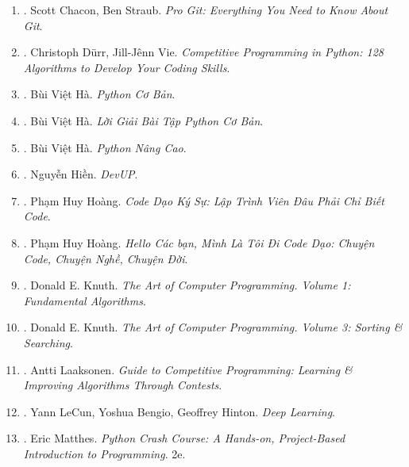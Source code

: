 \documentclass{article}
\begin{document}
\begin{enumerate}
	\item \cite{Chacon_Straub2014}. Scott Chacon, Ben Straub. {\it Pro Git: Everything You Need to Know About Git}.\hfill{\sf[reading]}
	
	\item \cite{Durr_Vie2021}. Christoph D\"urr, Jill-J\^enn Vie. {\it Competitive Programming in Python: 128 Algorithms to Develop Your Coding Skills}.
	
	\item \cite{Ha_Python_co_ban}. Bùi Việt Hà. {\it Python Cơ Bản}.\hfill{\sf[done]}
	
	\item \cite{Ha_loi_giai_BT_Python_co_ban}. Bùi Việt Hà. {\it Lời Giải Bài Tập Python Cơ Bản}.\hfill{\sf[reading]}
	
	\item \cite{Ha_Python_nang_cao}. Bùi Việt Hà. {\it Python Nâng Cao}.\hfill{\sf[done]}
	
	\item \cite{Hien_DevUp}. Nguyễn Hiền. {\it DevUP}.\hfill{\sf[done]}
	
	\item \cite{Hoang_code_dao_ky_su}. Phạm Huy Hoàng. {\it Code Dạo Ký Sự: Lập Trình Viên Đâu Phải Chỉ Biết Code}.\hfill{\sf[done]}
	
	\item \cite{Hoang_toi_di_code_dao}. Phạm Huy Hoàng. {\it Hello Các bạn, Mình Là Tôi Đi Code Dạo: Chuyện Code, Chuyện Nghề, Chuyện Đời}.\hfill{\sf[done]}
	
	\item \cite{Knuth1997}. Donald E. Knuth. {\it The Art of Computer Programming. Volume 1: Fundamental Algorithms}.\hfill{\sf[reading]}
	
	\item \cite{Knuth1998}. Donald E. Knuth. {\it The Art of Computer Programming. Volume 3: Sorting \& Searching}.\hfill{\sf[reading]}
	
	\item \cite{Laaksonen2020}. Antti Laaksonen. {\it Guide to Competitive Programming: Learning \& Improving Algorithms Through Contests}.\hfill{\sf[reading]}
	
	\item \cite{LeCun_Bengio_Hinton2015}. Yann LeCun, Yoshua Bengio, Geoffrey Hinton. {\it Deep Learning}.\hfill{\sf[reading]}
	
	\item \cite{Matthes2019}. Eric Matthes. {\it Python Crash Course: A Hands-on, Project-Based Introduction to Programming}. 2e.\hfill{\sf[reading]}
	

\end{enumerate}
\end{document}
